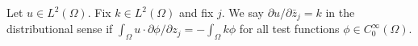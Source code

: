 
Let $u \in L^2(\Omega)$. Fix $k \in L^2(\Omega)$ and fix $j$. We say $\partial u / \partial \bar{z}_j = k$ in the distributional sense if $\int_\Omega u \cdot \partial \phi / \partial z_j = -\int_\Omega k \phi$ for all test functions $\phi \in C_0^\infty(\Omega)$.
